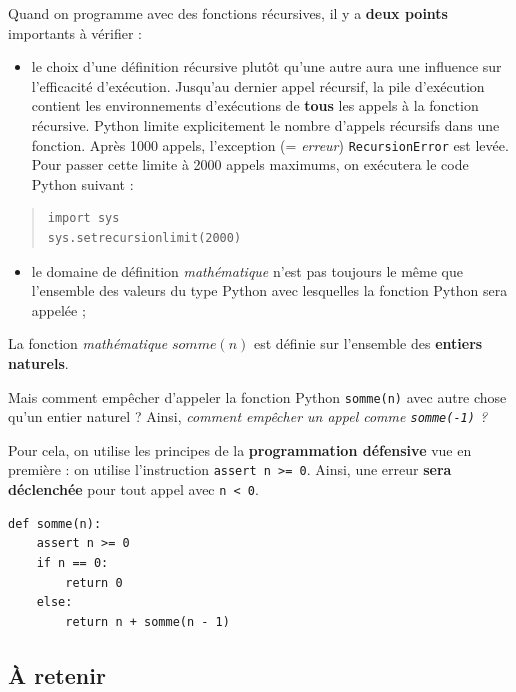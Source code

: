 \documentclass[a4paper,17pt]{extarticle}
\providecommand{\tightlist}{%
      \setlength{\itemsep}{0pt}\setlength{\parskip}{0pt}}
\begin{document}
    Quand on programme avec des fonctions récursives, il y a \textbf{deux
points} importants à vérifier :

\begin{itemize}
\tightlist
\item
  le choix d'une définition récursive plutôt qu'une autre aura une
  influence sur l'efficacité d'exécution. Jusqu'au dernier appel
  récursif, la pile d'exécution contient les environnements d'exécutions
  de \textbf{tous} les appels à la fonction récursive. Python limite
  explicitement le nombre d'appels récursifs dans une fonction. Après
  1000 appels, l'exception (= \emph{erreur}) \texttt{RecursionError} est
  levée. Pour passer cette limite à 2000 appels maximums, on exécutera
  le code Python suivant :
\end{itemize}

\begin{quote}
\begin{verbatim}
import sys
sys.setrecursionlimit(2000)
\end{verbatim}
\end{quote}

\begin{itemize}
\tightlist
\item
  le domaine de définition \emph{mathématique} n'est pas toujours le
  même que l'ensemble des valeurs du type Python avec lesquelles la
  fonction Python sera appelée ;
\end{itemize}
\begin{exemple}
    La fonction \emph{mathématique} \(somme(n)\) est définie sur l'ensemble
des \textbf{entiers naturels}.

Mais comment empêcher d'appeler la fonction Python \texttt{somme(n)}
avec autre chose qu'un entier naturel ? Ainsi, \emph{comment empêcher un
appel comme \texttt{somme(-1)} ?}

Pour cela, on utilise les principes de la \textbf{programmation
défensive} vue en première : on utilise l'instruction
\texttt{assert\ n\ \textgreater{}=\ 0}. Ainsi, une erreur \textbf{sera
déclenchée} pour tout appel avec \texttt{n\ \textless{}\ 0}.

\begin{verbatim}
def somme(n):
    assert n >= 0
    if n == 0:
        return 0
    else:
        return n + somme(n - 1)
\end{verbatim}

            \end{exemple}
    \hypertarget{uxe0-retenir}{%
\subsection{À retenir}\label{uxe0-retenir}}
\end{document}

